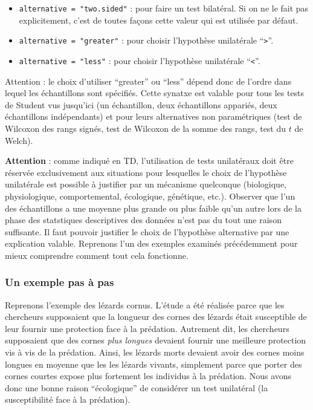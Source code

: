 \documentclass[a4paperpaper,]{article}
\providecommand{\tightlist}{%
  \setlength{\itemsep}{0pt}\setlength{\parskip}{0pt}}
\begin{document}
\begin{itemize}
\tightlist
\item
  \texttt{alternative\ =\ "two.sided"} : pour faire un test bilatéral. Si on ne le fait pas explicitement, c'est de toutes façons cette valeur qui est utilisée par défaut.
\item
  \texttt{alternative\ =\ "greater"} : pour choisir l'hypothèse unilatérale ``\texttt{\textgreater{}}''.
\item
  \texttt{alternative\ =\ "less"} : pour choisir l'hypothèse unilatérale ``\texttt{\textless{}}''.
\end{itemize}

Attention : le choix d'utiliser ``greater'' ou ``less'' dépend donc de l'ordre dans lequel les échantillons sont spécifiés. Cette synatxe est valable pour tous les tests de Student vus jusqu'ici (un échantillon, deux échantillons appariés, deux échantillons indépendants) et pour leurs alternatives non paramétriques (test de Wilcoxon des rangs signés, test de Wilcoxon de la somme des rangs, test du \(t\) de Welch).

\textbf{Attention} : comme indiqué en TD, l'utilisation de tests unilatéraux doit être réservée exclusivement aux situations pour lesquelles le choix de l'hypothèse unilatérale est possible à justifier par un mécanisme quelconque (biologique, physiologique, comportemental, écologique, génétique, etc.). Observer que l'un des échantillons a une moyenne plus grande ou plus faible qu'un autre lors de la phase des statstiques descriptives des données n'est pas du tout une raison suffisante. Il faut pouvoir justifier le choix de l'hypothèse alternative par une explication valable. Reprenons l'un des exemples examinés précédemment pour mieux comprendre comment tout cela fonctionne.

\hypertarget{un-exemple-pas-uxe0-pas}{%
\subsubsection{Un exemple pas à pas}\label{un-exemple-pas-uxe0-pas}}

Reprenons l'exemple des lézards cornus. L'étude a été réalisée parce que les chercheurs supposaient que la longueur des cornes des lézards était susceptible de leur fournir une protection face à la prédation. Autrement dit, les chercheurs supposaient que des cornes \emph{plus longues} devaient fournir une meilleure protection vis à vis de la prédation. Ainsi, les lézards morts devaient avoir des cornes moins longues en moyenne que les les lézards vivants, simplement parce que porter des cornes courtes expose plus fortement les individus à la prédation. Nous avons donc une bonne raison ``écologique'' de considérer un test unilatéral (la susceptibilité face à la prédation).
\end{document}
